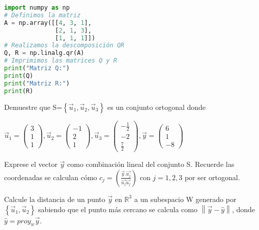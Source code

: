 {\begin{exercise}
\bigskip

\begin{lstlisting}[language = python, numbers = none, escapechar = !,
    basicstyle = \ttfamily\bfseries, linewidth = 1\linewidth] 
import numpy as np
# Definimos la matriz
A = np.array([[4, 3, 1],
              [2, 1, 3],
              [1, 1, 1]])
# Realizamos la descomposición QR
Q, R = np.linalg.qr(A)
# Imprimimos las matrices Q y R
print("Matriz Q:")
print(Q)
print("Matriz R:")
print(R)
\end{lstlisting}

\end{exercise}
\begin{exercise}
\item
Demuestre que S=$\left\{\vec{u}_1,\vec{u}_2,\vec{u}_3\right\}$ es un conjunto ortogonal donde

\bigskip


$\vec{u}_1=\left(\begin{array}{c} 3   \\ 1\\ 1                           
\end{array}
 \right) ,\vec{u}_2=\left(\begin{array}{c} -1   \\ 2\\ 1                           
\end{array}
 \right), \vec{u}_3=\left(\begin{array}{c} -\frac{1}{2}  \\ -2\\ \frac{7}{2}                       
\end{array} \right), \vec{y}=\left(\begin{array}{c} 6   \\ 1\\ -8                           
\end{array} \right)$


\bigskip

\noindent Exprese el vector $\vec{y}$
como combinación lineal del conjunto S. Recuerde las coordenadas se calculan cómo $c_j= (\frac{\vec{y}.\vec{u_j}}{\vec{u_j}\vec{u_j}})$ con $j=1,2,3$ por ser ortogonal.

\bigskip

\end{exercise}
\begin{exercise}
\item
Calcule la distancia de un punto $\vec{y}$ en $\mathbb{R}^3$ a un subespacio W generado por $\left\{\vec{u}_1,\vec{u}_2\right\}$ sabiendo que el punto más cercano se calcula como $\left\|\vec{y}-\hat{y}\right\|$, donde $\hat{y}=proy_w \vec{y}$.


\end{exercise}}
